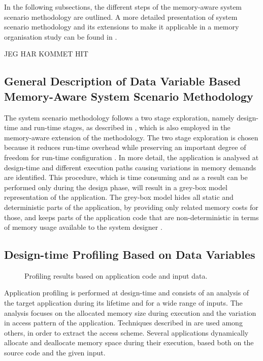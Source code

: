 \documentclass{acm_proc_article-sp}
\begin{document}
In the following subsections, the different steps of the memory-aware system scenario methodology are outlined. A more detailed presentation of system scenario methodology and its extensions to make it applicable in a memory organisation study can be found in \cite{Fil12}.

JEG HAR KOMMET HIT


\subsection{General Description of Data Variable Based Memory-Aware System Scenario Methodology}

The system scenario methodology follows a two stage exploration, namely design-time and run-time stages, as described in \cite{Gheorghita2007}, which is also employed in the memory-aware extension of the methodology. The two stage exploration is chosen because it reduces run-time overhead while preserving an important degree of freedom for run-time configuration \cite{tcm}. In more detail, the application is analysed at design-time and different execution paths causing variations in memory demands are identified. This procedure, which is time consuming and as a result can be performed only during the design phase, will result in a grey-box model representation of the application. The grey-box model hides all static and deterministic parts of the application, by providing only related memory costs for those, and keeps parts of the application code that are non-deterministic in terms of memory usage available to the system designer \cite{graybox}. 


\subsection{Design-time Profiling Based on Data Variables}

\begin{figure}[!t]
\centering
\caption{Profiling results based on application code and input data.}
\label{fig:profiling}
\end{figure}



Application profiling is performed at design-time and consists of an analysis of the target application during its lifetime and for a wide range of inputs. The analysis focuses on the allocated memory size during execution and the variation in access pattern of the application. Techniques described in \cite{Ang13b} are used among others, in order to extract the access scheme. Several applications dynamically allocate and deallocate memory space during their execution, based both on the source code and the given input. 
\end{document}
